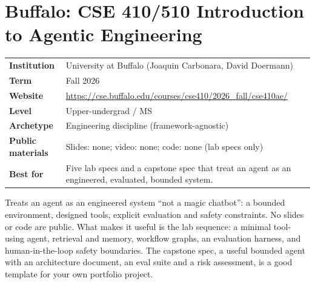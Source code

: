 \documentclass[10pt,oneside]{report}
\begin{document}
\chapter{Buffalo: CSE 410/510 Introduction to Agentic Engineering}\hypertarget{course-UB}{}
{\small\begin{tabularx}{\linewidth}{@{}>{\bfseries}l X@{}}\toprule
Institution & University at Buffalo (Joaquin Carbonara, David Doermann)\\
Term & Fall 2026\\
Website & \href{https://cse.buffalo.edu/courses/cse410/2026_fall/cse410ae/}{https://cse.buffalo.edu/courses/cse410/2026\_fall/cse410ae/}\\
Level & Upper-undergrad / MS\\
Archetype & Engineering discipline (framework-agnostic)\\
Public materials & Slides: none; video: none; code: none (lab specs only)\\
Best for & Five lab specs and a capstone spec that treat an agent as an engineered, evaluated, bounded system.\\
\bottomrule\end{tabularx}}

Treats an agent as an engineered system ``not a magic chatbot'': a bounded environment, designed tools, explicit evaluation and safety constraints.
No slides or code are public. What makes it useful is the lab sequence: a minimal tool-using agent, retrieval and memory, workflow graphs, an evaluation harness, and human-in-the-loop safety boundaries. The capstone spec, a useful bounded agent with an architecture document, an eval suite and a risk assessment, is a good template for your own portfolio project.
\end{document}
